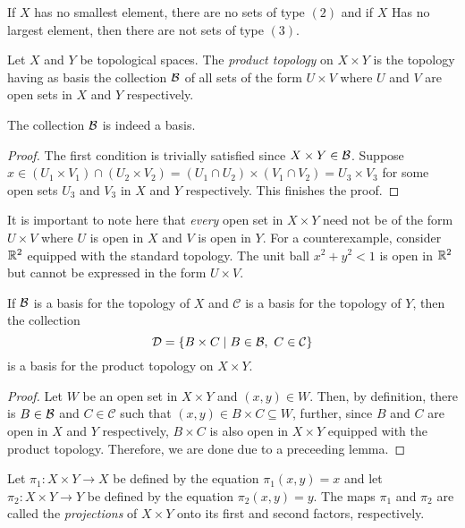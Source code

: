 If $X$ has no smallest element, there are no sets of type $(2)$ and if $X$ Has no largest element, then there are not sets of type $(3)$.

\begin{definition}
    Let $X$ and $Y$ be topological spaces. The \textit{product topology} on $X\times Y$ is the topology having as basis the collection $\mathcal{B}$ of all sets of the form $U\times V$ where $U$ and $V$ are open sets in $X$ and $Y$ respectively.
\end{definition}

\begin{proposition}
    The collection $\mathcal{B}$ is indeed a basis.
\end{proposition}
\begin{proof}
    The first condition is trivially satisfied since $X\times Y\in\mathcal{B}$. Suppose $x\in (U_1\times V_1)\cap(U_2\times V_2) = (U_1\cap U_2)\times(V_1\cap V_2) = U_3\times V_3$ for some open sets $U_3$ and $V_3$ in $X$ and $Y$ respectively. This finishes the proof.
\end{proof}

It is important to note here that \textit{every} open set in $X\times Y$ need not be of the form $U\times V$ where $U$ is open in $X$ and $V$ is open in $Y$. For a counterexample, consider $\mathbb{R}^2$ equipped with the standard topology. The unit ball $x^2 + y^2 < 1$ is open in $\mathbb{R}^2$ but cannot be expressed in the form $U\times V$.

\begin{proposition}
    If $\mathcal{B}$ is a basis for the topology of $X$ and $\mathcal{C}$ is a basis for the topology of $Y$, then the collection 
    \begin{equation*}
        \mathcal{D} = \{B\times C\mid B\in\mathcal{B},~C\in\mathcal{C}\}
    \end{equation*}
    is a basis for the product topology on $X\times Y$.
\end{proposition}
\begin{proof}
    Let $W$ be an open set in $X\times Y$ and $(x,y)\in W$. Then, by definition, there is $B\in\mathcal{B}$ and $C\in\mathcal{C}$ such that $(x,y)\in B\times C\subseteq W$, further, since $B$ and $C$ are open in $X$ and $Y$ respectively, $B\times C$ is also open in $X\times Y$ equipped with the product topology. Therefore, we are done due to a preceeding lemma.
\end{proof}

\begin{definition}
    Let $\pi_1:X\times Y\to X$ be defined by the equation $\pi_1(x,y) = x$ and let $\pi_2:X\times Y\to Y$ be defined by the equation $\pi_2(x,y) = y$. The maps $\pi_1$ and $\pi_2$ are called the \textit{projections} of $X\times Y$ onto its first and second factors, respectively.
\end{definition}

